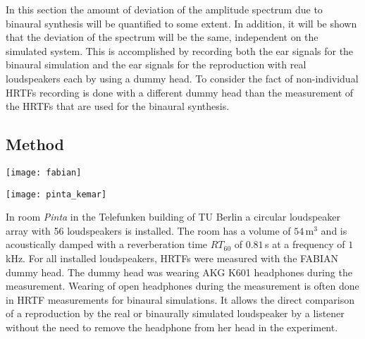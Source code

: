 In this section the amount of deviation of the amplitude spectrum due to
binaural synthesis will be quantified to some extent. In addition, it will be
shown that the deviation of the spectrum will be the same, independent on the
simulated system. This is accomplished by recording both the ear signals for
the binaural simulation and the ear signals for the reproduction with real
loudspeakers each by using a dummy head. To consider the fact of
non-individual \acp{HRTF} recording is done with a different dummy head than the
measurement of the \acp{HRTF} that are used for the binaural synthesis.

\subsection{Method}
%
\begin{marginfigure}
    \texttt{[image: fabian]}
    \caption{Recording of \acp{HRTF} with {\ft FABIAN} in room \emph{Pinta}. Note that this
    picture is from a recording session where {\ft FABIAN} was placed out of the center
    and did not wear headphones.
    }
    \label{fig:pinta_recordings_setup}
\end{marginfigure}
%
\begin{marginfigure}
    \texttt{[image: pinta\_kemar]}
    \caption{Recording of the ear signals for binaural synthesis and real loudspeakers in
    room \emph{Pinta}.
    }
    \label{fig:pinta_recordings_setup}
\end{marginfigure}
%
In room \emph{Pinta} in the Telefunken building of {\small TU} Berlin a circular
loudspeaker array with 56 loudspeakers is installed. The room has a volume of
$54$\,m$^3$ and is acoustically damped with a reverberation time $RT_{60}$ of 
$0.81$\,s at a frequency of $1$\,kHz.
For all installed loudspeakers, \acp{HRTF} were measured with the {\small FABIAN} dummy
head\autocite[The measurements were performed by Alexander Lindau, the used
dummy head is described in][]{Lindau2007a}.
The dummy head was wearing {\small AKG K601} headphones
during the measurement. Wearing of open headphones during the measurement
is often done in \ac{HRTF} measurements for binaural
simulations. It allows the direct comparison of a reproduction by the real
or binaurally simulated loudspeaker by a listener without the need to remove the
headphone from her head in the experiment.\autocite[An example of 
verifying binaural synthesis is presented in][]{Lindau2012}

